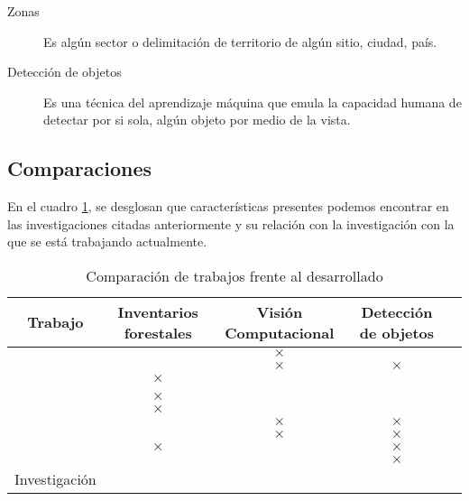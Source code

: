 \begin{description}
\item[Zonas]{Es algún sector o delimitación de territorio de algún sitio, ciudad, país.}
\end{description}

\begin{description}
\item[Detección de objetos]{Es una técnica del aprendizaje máquina que emula la capacidad humana de detectar por si sola, algún objeto por medio de la vista.}
\end{description}

\newpage

\subsection{Comparaciones}
En el cuadro \ref{tab:Comparación de trabajos frente al desarrollado}, se desglosan que características presentes podemos encontrar en las investigaciones citadas anteriormente y su relación con la investigación con la que se está trabajando actualmente.\\
\renewcommand{\tablename}{Cuadro}
\begin{table}[hbt!]
	{\centering
	\caption{Comparación de trabajos frente al desarrollado}
	\begin{adjustbox}{width=\textwidth}
		\begin{tabular}{|c|c|c|c|c|}
			\hline
			Trabajo &  Inventarios forestales &  Visión Computacional & Detección de objetos\\
			\hline
			\cite{rf1} & \checkmark & $\times$ & \checkmark \\
			\hline
			\cite{rf2}&  \checkmark  &  $\times$ & $\times$  \\
			\hline
			\cite{rf3}& $\times$ & \checkmark & \checkmark  \\
			\hline	
			\cite{rf9}& \checkmark & \checkmark & \checkmark  \\
			\hline
			\cite{rf10}& $\times$ & \checkmark & \checkmark  \\
			\hline
			\cite{rf11}& $\times$ & \checkmark & \checkmark  \\
			\hline
			\cite{rf12}& \checkmark  & $\times$ & $\times$  \\
			\hline
			\cite{rf13}& \checkmark & $\times$ & $\times$  \\
			\hline
			\cite{rf14}&  $\times$ & \checkmark & $\times$   \\
			\hline
			\cite{rf15}& \checkmark & \checkmark & $\times$  \\
			\hline
			Investigación & \checkmark & \checkmark & \checkmark \\
			\hline
		\end{tabular}
	\end{adjustbox}
	\label{tab:Comparación de trabajos frente al desarrollado}}
\end{table}

